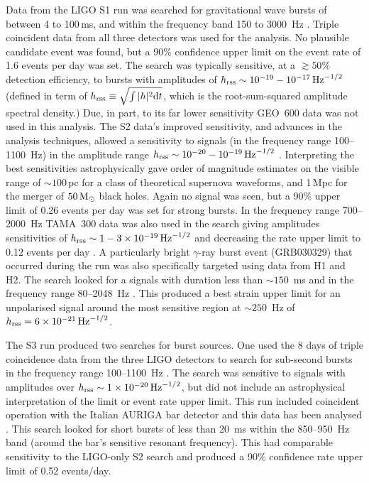 \documentclass{article}
\begin{document}
Data from the LIGO S1 run was searched for gravitational wave bursts of between
4 to 100\,ms, and within the frequency band 150 to 3000~Hz \cite{Abbott:2004b}.
Triple coincident data from all three detectors was used for the analysis. No
plausible candidate event was found, but a 90\% confidence upper limit on the
event rate of 1.6 events per day was set. The search was typically
sensitive, at a $\gtrsim50\%$ detection efficiency, to bursts with amplitudes of
$h_{\rm rss}\sim10^{-19}-10^{-17}\,{\rm Hz}^{-1/2}$ (defined in term of $h_{\rm
rss} \equiv \sqrt{\int|h|^2{\rm d}t}$, which is the root-sum-squared amplitude
spectral density.) Due, in part, to its far lower sensitivity GEO~600 data was
not used in this analysis. The S2 data's improved sensitivity, and advances in
the analysis techniques, allowed a sensitivity to signals (in the frequency
range 100--1100~Hz) in the amplitude range $h_{\rm
rss}\sim10^{-20}-10^{-19}\,{\rm Hz}^{-1/2}$ \cite{Abbott:2005a}. Interpreting
the best sensitivities astrophysically gave order of magnitude estimates on
the visible range of $\sim100$\,pc for a class of theoretical supernova
waveforms, and 1\,Mpc for the merger of $50\,{\rm M}_{\odot}$ black holes. Again
no signal was seen, but a 90\% upper limit of 0.26 events per day was set for
strong bursts. In the frequency range 700--2000~Hz TAMA~300 data was also used
in the search giving amplitudes sensitivities of $h_{\rm
rss}\sim1-3\times10^{-19}\,{\rm Hz}^{-1/2}$ and decreasing the rate upper limit
to 0.12 events per day \cite{Abbott:2005c}. A particularly bright $\gamma$-ray 
burst event (GRB030329) that occurred during the run was also specifically
targeted using data from H1 and H2. The search looked for a signals with
duration less than $\sim 150$~ms and in the frequency range 80--2048~Hz
\cite{Abbott:2005d}. This produced a best strain upper limit for an unpolarised
signal around the most sensitive region at  $\sim250$~Hz of $h_{\rm
rss}=6\times10^{-21}\,{\rm Hz}^{-1/2}$.

The S3 run produced two searches for burst sources. One used the 8 days of
triple coincidence data from the three LIGO detectors to search for sub-second
bursts in the frequency range 100--1100~Hz \cite{Abbott:2006a}. The search was
sensitive to signals with amplitudes over $h_{\rm rss}\sim1\times10^{-20}\,{\rm
Hz}^{-1/2}$, but did not include an astrophysical interpretation of the limit or
event rate upper limit. This run included coincident operation with the Italian
AURIGA bar detector and this data has been analysed \cite{Baggio:2008}. This 
search looked for short bursts of less than 20~ms within the 850--950~Hz band 
(around the bar's sensitive resonant frequency). This had comparable sensitivity
to the LIGO-only S2 search and produced a 90\% confidence rate upper limit of 
0.52 events/day.
\end{document}
